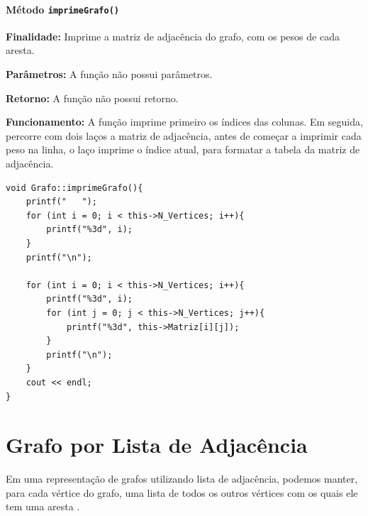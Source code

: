 \documentclass{article}
\begin{document}
\paragraph{Método \texttt{imprimeGrafo()}}

    \mbox{}\par
    \noindent
    \textbf{Finalidade:} Imprime a matriz de adjacência do grafo, com os pesos de cada aresta.

        \textbf{Parâmetros:} A função não possui parâmetros.

    \textbf{Retorno:} A função não possui retorno.

    \textbf{Funcionamento:} A função imprime primeiro os índices das colunas. Em seguida, percorre com dois laços a matriz de adjacência, antes de começar a imprimir cada peso na linha, o laço imprime o índice atual, para formatar a tabela da matriz de adjacência.

\begin{verbatim}
void Grafo::imprimeGrafo(){
    printf("   ");
    for (int i = 0; i < this->N_Vertices; i++){
        printf("%3d", i);
    }
    printf("\n");

    for (int i = 0; i < this->N_Vertices; i++){
        printf("%3d", i);
        for (int j = 0; j < this->N_Vertices; j++){
            printf("%3d", this->Matriz[i][j]);
        }
        printf("\n");
    }
    cout << endl;
}
\end{verbatim}






























\section*{Grafo por Lista de Adjacência}
Em uma representação de grafos utilizando lista de adjacência, podemos manter, para cada vértice do grafo, uma lista de todos os outros vértices com os quais ele tem uma aresta \cite{wikipedia:lista_adjacencia}.
\end{document}
